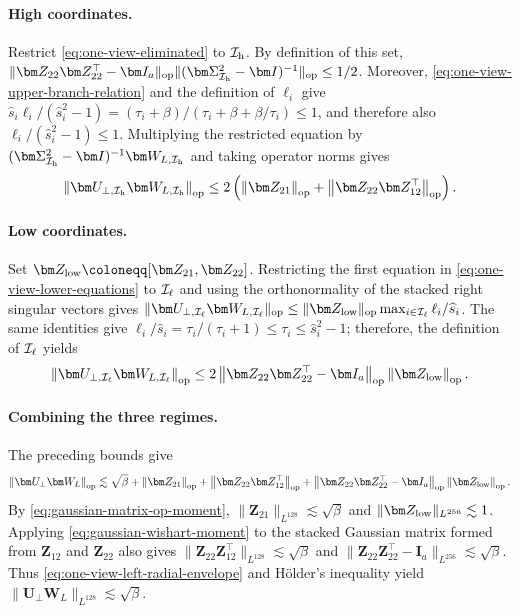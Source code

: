 \documentclass[11pt]{article}
\newcommand{\trans}{\top}
\newcommand{\opn}[1]{\left\lVert #1\right\rVert_{\mathrm{op}}}
\newcommand{\cI}{\mathcal{I}}
\begin{document}
\paragraph{High coordinates.}
Restrict \cref{eq:one-view-eliminated} to $\cI_{\rm h}$.
By definition of this set,
$\|\bm Z_{22}\bm Z_{22}^\trans-\bm I_a\|_{\mathrm{op}}
\|(\bm\Sigma_{\cI_{\rm h}}^2-\bm I)^{-1}\|_{\mathrm{op}}
\le1/2$.
Moreover, \cref{eq:one-view-upper-branch-relation} and the definition of
$\ell_i$ give
$\widehat s_i\ell_i/(\widehat s_i^2-1)
=(\tau_i+\beta)/(\tau_i+\beta+\beta/\tau_i)\le1$, and therefore also
$\ell_i/(\widehat s_i^2-1)\le1$.
Multiplying the restricted equation by
$(\bm\Sigma_{\cI_{\rm h}}^2-\bm I)^{-1}\bm W_{L,\cI_{\rm h}}$
and taking operator norms gives
\[
  \opn{\bm U_{\perp,\cI_{\rm h}}\bm W_{L,\cI_{\rm h}}}
  \le
  2\left(
    \opn{\bm Z_{21}}
    +
    \opn{\bm Z_{22}\bm Z_{12}^\trans}
  \right).
\]

\paragraph{Low coordinates.}
Set
$\bm Z_{\rm low}\coloneqq[\bm Z_{21},\bm Z_{22}]$.
Restricting the first equation in
\cref{eq:one-view-lower-equations} to $\cI_{\rm \ell}$ and using the
orthonormality of the stacked right singular vectors gives
$\|\bm U_{\perp,\cI_{\rm \ell}}\bm W_{L,\cI_{\rm \ell}}\|_{\mathrm{op}}
\le
\|\bm Z_{\rm low}\|_{\mathrm{op}}
\max_{i\in\cI_{\rm \ell}}\ell_i/\widehat s_i$.
The same identities give
$\ell_i/\widehat s_i=\tau_i/(\tau_i+1)\le\tau_i\le \widehat s_i^2-1$; therefore, the
definition of $\cI_{\rm \ell}$ yields
\[
  \opn{\bm U_{\perp,\cI_{\rm \ell}}\bm W_{L,\cI_{\rm \ell}}}
  \le
  2
  \opn{\bm Z_{22}\bm Z_{22}^\trans-\bm I_a}
  \opn{\bm Z_{\rm low}}.
\]

\paragraph{Combining the three regimes.}
The preceding bounds give
\begin{equation}
\label{eq:one-view-left-radial-envelope}
  \opn{\bm U_\perp\bm W_L}
  \lesssim
  \sqrt\beta
  +
  \opn{\bm Z_{21}}
  +
  \opn{\bm Z_{22}\bm Z_{12}^\trans}
  +
  \opn{\bm Z_{22}\bm Z_{22}^\trans-\bm I_a}
  \opn{\bm Z_{\rm low}}.
\end{equation}
By \cref{eq:gaussian-matrix-op-moment},
$\|\bm Z_{21}\|_{L^{128}}\lesssim\sqrt\beta$ and
$\|\bm Z_{\rm low}\|_{L^{256}}\lesssim1$.
Applying \cref{eq:gaussian-wishart-moment} to the stacked Gaussian matrix
formed from $\bm Z_{12}$ and $\bm Z_{22}$ also gives
$\|\bm Z_{22}\bm Z_{12}^\trans\|_{L^{128}}\lesssim\sqrt\beta$ and
$\|\bm Z_{22}\bm Z_{22}^\trans-\bm I_a\|_{L^{256}}
\lesssim\sqrt\beta$.
Thus \cref{eq:one-view-left-radial-envelope} and H\"older's inequality
yield
$\|\bm U_\perp\bm W_L\|_{L^{128}}\lesssim\sqrt\beta$.
\end{document}
